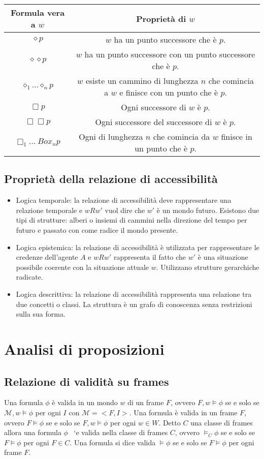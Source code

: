 \begin{tabular}{|c|c|}
\hline
Formula vera a $w$ & Propriet\`a di $w$\\
\hline
$\diamond p$ & $w$ ha un punto successore che \`e $p$.\\
\hline
$\diamond\diamond p$ & $w$ ha un punto successore con un punto successore che \`e $p$.\\
\hline
$\diamond_1\dots\diamond_n p$ & $w$ esiste un cammino di lunghezza $n$ che comincia a $w$ e finisce con un punto che \`e $p$.\\
\hline
$\Box p$ & Ogni successore di $w$ \`e $p$.\\
\hline
$\Box\Box p$ & Ogni successore del successore di $w$ \`e $p$.\\
\hline
$\Box_1\dots\ Box_n p$ & Ogni di lunghezza $n$ che comincia da $w$ finisce in un punto che \`e $p$.\\
 \hline
\end{tabular}
\subsection{Propriet\`a della relazione di accessibilit\`a}
\begin{itemize}
\item Logica temporale: la relazione di accessibilit\`a deve rappresentare una relazione temporale e $wRw'$ vuol dire che $w'$ \`e un mondo futuro. Esistono due tipi di strutture: alberi o insiemi di cammini 
nella direzione del tempo per futuro e passato con come radice il mondo presente.
\item Logica epistemica: la relazione di accessibilit\`a \`e utilizzata per rappresentare le credenze dell'agente $A$ e $wRw'$ rappresenta il fatto che $w'$ \`e una situazione possibile coerente con la situazione
attuale $w$. Utilizzano strutture gerarchiche radicate.
\item Logica descrittiva: la relazione di accessibilit\`a rappresenta una relazione tra due concetti o classi. La struttura \`e un grafo di conoscenza senza restrizioni sulla sua forma.
\end{itemize}
\section{Analisi di proposizioni}
\subsection{Relazione di validit\`a su frames}
Una formula $\phi$ \`e valida in un mondo $w$ di un frame $F$, ovvero $F,w\models\phi$ se e solo se $\mathcal{M}, w\models\phi$ per ogni $I$ con $\mathcal{M}=<F,I>$. Una formula \`e valida in un 
frame $F$, ovvero $F\models\phi$ se e solo se $F,w\models\phi$ per ogni $w\in W$. Detto $C$ una classe di frames allora una formula $\phi$ \ `e valida nella classe di frames $C$, ovvero $\models_C\phi$ 
se e solo se $F\models\phi$ per ogni $F\in C$. Una formula si dice valida $\models\phi$ se e solo se $F\models\phi$ per ogni frame $F$.
